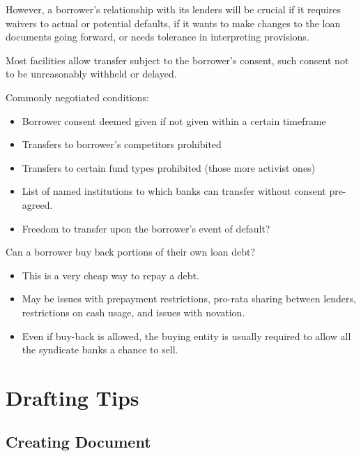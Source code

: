 \documentclass[
]{article}
\providecommand{\tightlist}{%
  \setlength{\itemsep}{0pt}\setlength{\parskip}{0pt}}
\newenvironment{env-74ec9a83-00fa-4ee6-a586-5d505a5676c9}
{
    \savenotes\tcolorbox[blanker,breakable,left=5pt,borderline west={2pt}{-4pt}{gray}]
}
{
    \endtcolorbox\spewnotes
}
\begin{document}
However, a borrower's relationship with its lenders will be crucial if
it requires waivers to actual or potential defaults, if it wants to make
changes to the loan documents going forward, or needs tolerance in
interpreting provisions.

Most facilities allow transfer subject to the borrower's consent, such
consent not to be unreasonably withheld or delayed.

Commonly negotiated conditions:

\begin{itemize}
\tightlist
\item
  Borrower consent deemed given if not given within a certain timeframe
\item
  Transfers to borrower's competitors prohibited
\item
  Transfers to certain fund types prohibited (those more activist ones)
\item
  List of named institutions to which banks can transfer without consent
  pre-agreed.
\item
  Freedom to transfer upon the borrower's event of default?
\end{itemize}

\begin{env-74ec9a83-00fa-4ee6-a586-5d505a5676c9}

Can a borrower buy back portions of their own loan debt?

\begin{itemize}
\tightlist
\item
  This is a very cheap way to repay a debt.
\item
  May be issues with prepayment restrictions, pro-rata sharing between
  lenders, restrictions on cash usage, and issues with novation.
\item
  Even if buy-back is allowed, the buying entity is usually required to
  allow all the syndicate banks a chance to sell.
\end{itemize}

\end{env-74ec9a83-00fa-4ee6-a586-5d505a5676c9}

\hypertarget{drafting-tips}{%
\section{Drafting Tips}\label{drafting-tips}}

\hypertarget{creating-document}{%
\subsection{Creating Document}\label{creating-document}}
\end{document}
